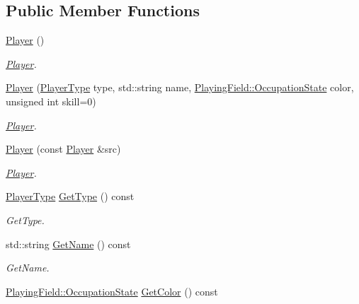 \subsection*{Public Member Functions}
\begin{DoxyCompactItemize}
\item 
\hypertarget{classPlayer_affe0cc3cb714f6deb4e62f0c0d3f1fd8}{\hyperlink{classPlayer_affe0cc3cb714f6deb4e62f0c0d3f1fd8}{Player} ()}\label{classPlayer_affe0cc3cb714f6deb4e62f0c0d3f1fd8}

\begin{DoxyCompactList}\small\item\em \hyperlink{classPlayer}{Player}. \end{DoxyCompactList}\item 
\hyperlink{classPlayer_a66f0cbcaa9de5f81fcbb4ee72d0f110e}{Player} (\hyperlink{classPlayer_a97dc3c423902370176605121e8f68415}{Player\-Type} type, std\-::string name, \hyperlink{classPlayingField_ac6df152a3f820aa04a00ab4df4a9d265}{Playing\-Field\-::\-Occupation\-State} color, unsigned int skill=0)
\begin{DoxyCompactList}\small\item\em \hyperlink{classPlayer}{Player}. \end{DoxyCompactList}\item 
\hyperlink{classPlayer_a6d2881f060b07eb48077cad6044fcd8f}{Player} (const \hyperlink{classPlayer}{Player} \&src)
\begin{DoxyCompactList}\small\item\em \hyperlink{classPlayer}{Player}. \end{DoxyCompactList}\item 
\hyperlink{classPlayer_a97dc3c423902370176605121e8f68415}{Player\-Type} \hyperlink{classPlayer_adbb81c3cffe824c9ed8e18f1f635a1a3}{Get\-Type} () const 
\begin{DoxyCompactList}\small\item\em Get\-Type. \end{DoxyCompactList}\item 
std\-::string \hyperlink{classPlayer_aa5030908379dbc95594e4a9856758fef}{Get\-Name} () const 
\begin{DoxyCompactList}\small\item\em Get\-Name. \end{DoxyCompactList}\item 
\hyperlink{classPlayingField_ac6df152a3f820aa04a00ab4df4a9d265}{Playing\-Field\-::\-Occupation\-State} \hyperlink{classPlayer_a49f420e5204c895b9a94f07f6aaf639f}{Get\-Color} () const 

\end{DoxyCompactItemize}
